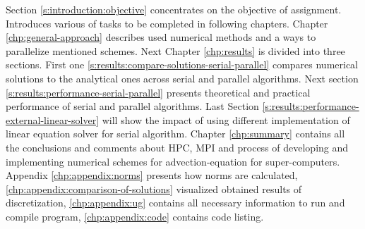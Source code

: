 	Section \ref{s:introduction:objective} concentrates on the objective of assignment. Introduces various of tasks to be completed in following chapters. Chapter \ref{chp:general-approach} describes used numerical methods and a ways to parallelize mentioned schemes. Next Chapter \ref{chp:results} is divided into three sections. First one \ref{s:results:compare-solutions-serial-parallel} compares numerical solutions to the analytical ones across serial and parallel algorithms. Next section \ref{s:results:performance-serial-parallel} presents theoretical and practical performance of serial and parallel algorithms. Last Section \ref{s:results:performance-external-linear-solver} will show the impact of using different implementation of linear equation solver for serial algorithm. Chapter \ref{chp:summary} contains all the conclusions and comments about \gls{HPC}, \gls{MPI} and process of developing and implementing numerical schemes for \gls{advection-equation} for \gls{super-computer}s. Appendix \ref{chp:appendix:norms} presents how norms are calculated, \ref{chp:appendix:comparison-of-solutions} visualized obtained results of discretization, \ref{chp:appendix:ug} contains all necessary information to run and compile program, \ref{chp:appendix:code} contains code listing.
	
	